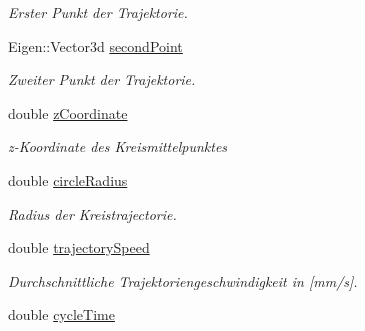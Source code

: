 \begin{DoxyCompactItemize}
\begin{DoxyCompactList}\small\item\em Erster Punkt der Trajektorie. \end{DoxyCompactList}\item 
\hypertarget{classTrajectoryGenerator_a1d6419470b689dd6cb23b0c7236fffd9}{Eigen\-::\-Vector3d \hyperlink{classTrajectoryGenerator_a1d6419470b689dd6cb23b0c7236fffd9}{second\-Point}}\label{classTrajectoryGenerator_a1d6419470b689dd6cb23b0c7236fffd9}

\begin{DoxyCompactList}\small\item\em Zweiter Punkt der Trajektorie. \end{DoxyCompactList}\item 
\hypertarget{classTrajectoryGenerator_abffbe637a297379a60c22f6efd53b8d9}{double \hyperlink{classTrajectoryGenerator_abffbe637a297379a60c22f6efd53b8d9}{z\-Coordinate}}\label{classTrajectoryGenerator_abffbe637a297379a60c22f6efd53b8d9}

\begin{DoxyCompactList}\small\item\em z-\/\-Koordinate des Kreismittelpunktes \end{DoxyCompactList}\item 
\hypertarget{classTrajectoryGenerator_ac02b6a2df43dc5706507835ad5cb84d8}{double \hyperlink{classTrajectoryGenerator_ac02b6a2df43dc5706507835ad5cb84d8}{circle\-Radius}}\label{classTrajectoryGenerator_ac02b6a2df43dc5706507835ad5cb84d8}

\begin{DoxyCompactList}\small\item\em Radius der Kreistrajectorie. \end{DoxyCompactList}\item 
\hypertarget{classTrajectoryGenerator_a908a13ec9428ff58ea9c4622b3845337}{double \hyperlink{classTrajectoryGenerator_a908a13ec9428ff58ea9c4622b3845337}{trajectory\-Speed}}\label{classTrajectoryGenerator_a908a13ec9428ff58ea9c4622b3845337}

\begin{DoxyCompactList}\small\item\em Durchschnittliche Trajektoriengeschwindigkeit in \mbox{[}mm/s\mbox{]}. \end{DoxyCompactList}\item 
\hypertarget{classTrajectoryGenerator_aac65fb524447f9d1e77fb52bfcf70307}{double \hyperlink{classTrajectoryGenerator_aac65fb524447f9d1e77fb52bfcf70307}{cycle\-Time}}\label{classTrajectoryGenerator_aac65fb524447f9d1e77fb52bfcf70307}


\end{DoxyCompactItemize}
